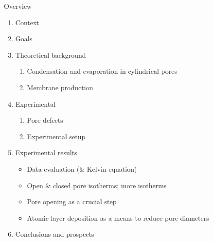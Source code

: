 \documentclass[../defence.tex]{subfiles}
\begin{document}
  \begin{frame}{Overview}
      \begin{enumerate}
        \item Context
        \item Goals
        \item Theoretical background\\
          \begin{enumerate}
            \item Condensation and evaporation in cylindrical pores
            \item Membrane production
          \end{enumerate}
        \item Experimental
          \begin{enumerate}
            \item Pore defects
            \item Experimental setup
          \end{enumerate}
        \item Experimental results
          \begin{itemize}
            \item Data evaluation (\& Kelvin equation)
            \item Open \& closed pore isotherms; more isotherms
            \item Pore opening as a crucial step
            \item Atomic layer deposition as a means to reduce pore diameters
          \end{itemize}
        \item Conclusions and prospects
      \end{enumerate}
  \end{frame}
\end{document}
